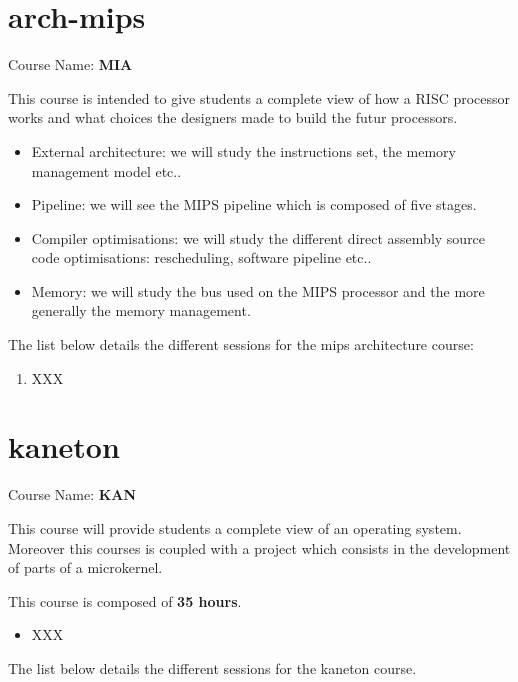 \begin{multicols}{2}



\section{arch-mips}

Course Name: \textbf{MIA}

This course is intended to give students a complete view of how a RISC
processor works and what choices the designers made to build the futur
processors.

\begin{itemize}
  \item
    External architecture: we will study the instructions set,
    the memory management model etc..
  \item
    Pipeline: we will see the MIPS pipeline which is composed of five
    stages.
  \item
    Compiler optimisations: we will study the different direct assembly
    source code optimisations: rescheduling, software pipeline etc..
  \item
    Memory: we will study the bus used on the MIPS processor and the
    more generally  the memory management.
\end{itemize}

The list below details the different sessions for the mips architecture
course:

\begin{enumerate}
  \item
    XXX
\end{enumerate}



\section{kaneton}

Course Name: \textbf{KAN}

This course will provide students a complete view of an operating system.
Moreover this courses is coupled with a project which consists in the
development of parts of a microkernel.

This course is composed of \textbf{35 hours}.

\begin{itemize}
  \item
    XXX
\end{itemize}

The list below details the different sessions for the kaneton course.


\end{multicols}
